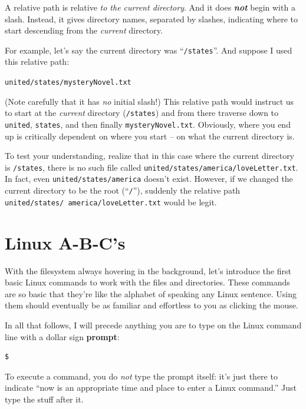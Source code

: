 A relative path is relative \textit{to the current directory}. And it does
\textit{\textbf{not}} begin with a slash. Instead, it gives directory names,
separated by slashes, indicating where to start descending from the
\textit{current} directory.

For example, let's say the current directory was ``\texttt{/states}''. And
suppose I used this relative path:

\quad\quad \texttt{united/states/mysteryNovel.txt}

(Note carefully that it has \textit{no} initial slash!) This relative path
would instruct us to start at the \textit{current} directory (\texttt{/states})
and from there traverse down to \texttt{united}, \texttt{states}, and then
finally \texttt{mysteryNovel.txt}. Obviously, where you end up is critically
dependent on where you start -- on what the current directory is.

To test your understanding, realize that in this case where the current
directory is \texttt{/states}, there is no such file called
\texttt{united/states/america/loveLetter.txt}. In fact, even 
\texttt{united/states/america} doesn't exist. However, if we changed the
current directory to be the root (``\texttt{/}''), suddenly the relative path
\texttt{united/states/ america/loveLetter.txt} would be legit.

\section{Linux A-B-C's}

With the filesystem always hovering in the background, let's introduce the
first basic Linux commands to work with the files and directories. These
commands are so basic that they're like the alphabet of speaking any Linux
sentence. Using them should eventually be as familiar and effortless to you as
clicking the mouse.

In all that follows, I will precede anything you are to type on the Linux
command line with a dollar sign \textbf{prompt}:

\begin{Verbatim}[fontsize=\small]
$
\end{Verbatim}

To execute a command, you do \textit{not} type the prompt itself: it's just
there to indicate ``now is an appropriate time and place to enter a Linux
command.'' Just type the stuff after it.

